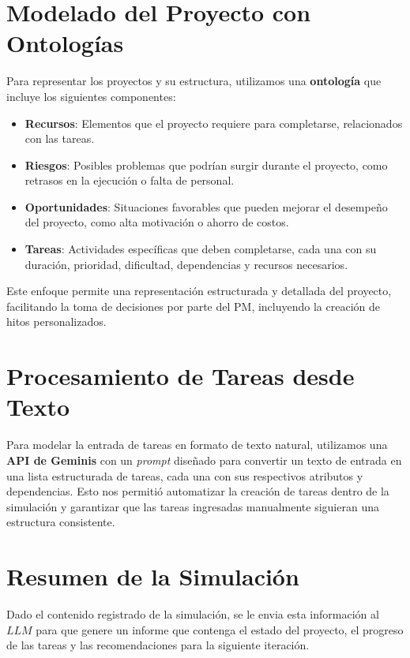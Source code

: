 \documentclass[a4paper, 12pt]{article}
\begin{document}
\section{Modelado del Proyecto con Ontologías}
Para representar los proyectos y su estructura, utilizamos una \textbf{ontología} que incluye los siguientes componentes:
\begin{itemize}
    \item \textbf{Recursos}: Elementos que el proyecto requiere para completarse, relacionados con las tareas.
    \item \textbf{Riesgos}: Posibles problemas que podrían surgir durante el proyecto, como retrasos en la ejecución o falta de personal.
    \item \textbf{Oportunidades}: Situaciones favorables que pueden mejorar el desempeño del proyecto, como alta motivación o ahorro de costos.
    \item \textbf{Tareas}: Actividades específicas que deben completarse, cada una con su duración, prioridad, dificultad, dependencias y recursos necesarios.
\end{itemize}
Este enfoque permite una representación estructurada y detallada del proyecto, facilitando la toma de decisiones por parte del PM, incluyendo la creación de hitos personalizados.

\section{Procesamiento de Tareas desde Texto}
Para modelar la entrada de tareas en formato de texto natural, utilizamos una \textbf{API de Geminis} con un \textit{prompt} diseñado para convertir un texto de entrada en una lista estructurada de tareas, cada una con sus respectivos atributos y dependencias. Esto nos permitió automatizar la creación de tareas dentro de la simulación y garantizar que las tareas ingresadas manualmente siguieran una estructura consistente.

\section{Resumen de la Simulación}
Dado el contenido registrado de la simulación, se le envia esta información al $LLM$ para que genere un informe que contenga el estado del proyecto, el progreso de las tareas y las recomendaciones para la siguiente iteración.
\end{document}
